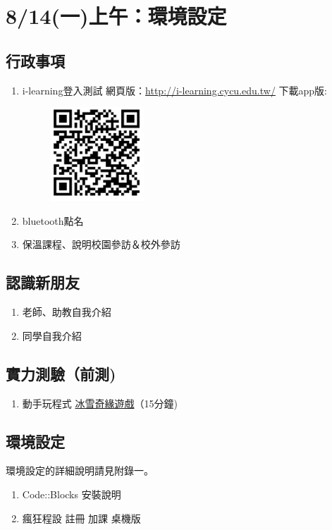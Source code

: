 
\section{8/14(一)上午：環境設定}

\subsection{行政事項}
\begin{enumerate}
	\item i-learning登入測試
		\subitem 網頁版：\url{http://i-learning.cycu.edu.tw/}
		\subitem 下載app版:
		\begin{figure}[H]
			\centering
			\includegraphics[width=3.5cm]{fig/QRcode}
		\end{figure}
	\item bluetooth點名
	\item 保溫課程、說明校園參訪＆校外參訪

\end{enumerate}
\subsection{認識新朋友}
\begin{enumerate}
	\item 老師、助教自我介紹
	\item 同學自我介紹
\end{enumerate}
	

\subsection{實力測驗（前測)}
\begin{enumerate}

\item 動手玩程式
\subitem \href{https://studio.code.org/courses}{冰雪奇緣遊戲}（15分鐘)
\end{enumerate}

\subsection{環境設定}
環境設定的詳細說明請見附錄一。
\begin{enumerate}
\item Code::Blocks
\subitem 安裝說明
\item 瘋狂程設
\subitem 註冊
\subitem 加課
\subitem 桌機版	
\end{enumerate}

